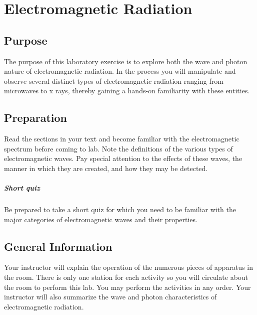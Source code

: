 \chapter{Electromagnetic Radiation}

\begin{multicols}{2}
\section{Purpose}
  The purpose of this laboratory exercise is to explore both the wave and photon nature of electromagnetic radiation.  In the process you will manipulate and observe several distinct types of electromagnetic radiation ranging from microwaves to x rays, thereby gaining a hands-on familiarity with these entities.

\section{Preparation}
  Read the sections in your text and become familiar with the electromagnetic spectrum before coming to lab.  Note the definitions of the various types of electromagnetic waves.  Pay special attention to the effects of these waves, the manner in which they are created, and how they may be detected.

\paragraph{Short quiz}
  Be prepared to take a short quiz for which you need to be familiar with the major categories of electromagnetic waves and their properties.
\section{General Information}

Your instructor will explain the operation of the numerous pieces of apparatus in the room.  There is only one station for each activity so you will circulate about the room to perform this lab.  You may perform the activities in any order.
Your instructor will also summarize the wave and photon characteristics of electromagnetic radiation.


\end{multicols}
